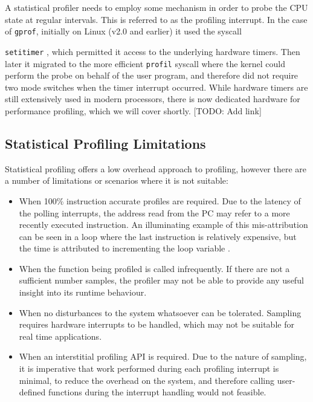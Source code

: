 A statistical profiler needs to employ some mechanism in order to probe the CPU state at regular intervals. This is referred to as the profiling interrupt. In the case of \texttt{gprof}, initially on Linux (v2.0 and earlier) it used the syscall {\texttt{setitimer} \cite{DocsGProfImpl}, which permitted it access to the underlying hardware timers. Then later it migrated to the more efficient \texttt{profil} syscall where the kernel could perform the probe on behalf of the user program, and therefore did not require two mode switches when the timer interrupt occurred. While hardware timers are still extensively used in modern processors, there is now dedicated hardware for performance profiling, which we will cover shortly. [TODO: Add link]

\subsection{Statistical Profiling Limitations}

Statistical profiling offers a low overhead approach to profiling, however there are a number of limitations or scenarios where it is not suitable:

\begin{itemize}
    \item When 100\% instruction accurate profiles are required. Due to the latency of the polling interrupts, the address read from the PC may refer to a more recently executed instruction. An illuminating example of this mis-attribution can be seen in a loop where the last instruction is relatively expensive, but the time is attributed to incrementing the loop variable \cite{DocsOProfileInter}.
    \item When the function being profiled is called infrequently. If there are not a sufficient number samples, the profiler may not be able to provide any useful insight into its runtime behaviour.
    \item When no disturbances to the system whatsoever can be tolerated. Sampling requires hardware interrupts to be handled, which may not be suitable for real time applications.
    \item When an interstitial profiling API is required. Due to the nature of sampling, it is imperative that work performed during each profiling interrupt is minimal, to reduce the overhead on the system, and therefore calling user-defined functions during the interrupt handling would not feasible.
\end{itemize}

}
